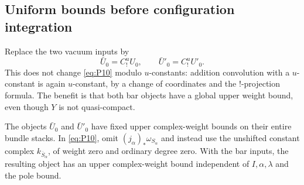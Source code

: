 \subsection{Uniform bounds before configuration integration}
\label{planch:uniform-bounds}

Replace the two vacuum inputs by
\[
 \bar U_0=C_!^uU_0,\qquad \bar U'_0=C_!^uU'_0.
\]
This does not change \eqref{eq:P10} modulo $u$-constants: addition
convolution with a $u$-constant is again $u$-constant, by a change
of coordinates and the $!$-projection formula.  The benefit is that
both bar objects have a global upper weight bound, even though $Y$
is not quasi-compact.

\begin{lemma}
\label{planch:vacuum-weight}
The objects $\bar U_0$ and $\bar U'_0$ have fixed upper complex-weight
bounds on their entire bundle stacks.  In \eqref{eq:P10}, omit
$(j_\alpha)_*\omega_{S_\alpha}$ and instead use the unshifted constant
complex $k_{\overline S_\alpha}$, of weight zero and ordinary degree
zero.  With the bar inputs, the resulting
object has an upper complex-weight bound independent of
$I,\alpha,\lambda$ and the pole bound.
\end{lemma}

